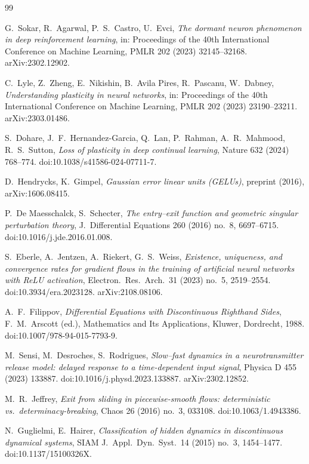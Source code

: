 \documentclass[11pt]{article}
\theoremstyle{definition}
\theoremstyle{remark}
\begin{document}
\begin{thebibliography}{99}

 G.~Sokar, R.~Agarwal, P.~S.~Castro, U.~Evci, \emph{The dormant
neuron phenomenon in deep reinforcement learning}, in: Proceedings of the 40th
International Conference on Machine Learning, PMLR 202 (2023) 32145--32168.
arXiv:2302.12902.

 C.~Lyle, Z.~Zheng, E.~Nikishin, B.~Avila Pires, R.~Pascanu,
W.~Dabney, \emph{Understanding plasticity in neural networks}, in: Proceedings of
the 40th International Conference on Machine Learning, PMLR 202 (2023)
23190--23211. arXiv:2303.01486.

 S.~Dohare, J.~F.~Hernandez-Garcia, Q.~Lan, P.~Rahman,
A.~R.~Mahmood, R.~S.~Sutton, \emph{Loss of plasticity in deep continual
learning}, Nature 632 (2024) 768--774. doi:10.1038/s41586-024-07711-7.

 D.~Hendrycks, K.~Gimpel, \emph{Gaussian error linear units
(GELUs)}, preprint (2016), arXiv:1606.08415.

 P.~De Maesschalck, S.~Schecter, \emph{The entry--exit function
and geometric singular perturbation theory}, J.~Differential Equations 260 (2016)
no.~8, 6697--6715. doi:10.1016/j.jde.2016.01.008.

 S.~Eberle, A.~Jentzen, A.~Riekert, G.~S.~Weiss, \emph{Existence,
uniqueness, and convergence rates for gradient flows in the training of
artificial neural networks with ReLU activation}, Electron.\ Res.\ Arch.\ 31
(2023) no.~5, 2519--2554. doi:10.3934/era.2023128. arXiv:2108.08106.

 A.~F.~Filippov, \emph{Differential Equations with Discontinuous
Righthand Sides}, F.~M.~Arscott (ed.), Mathematics and Its Applications, Kluwer,
Dordrecht, 1988. doi:10.1007/978-94-015-7793-9.

 M.~Sensi, M.~Desroches, S.~Rodrigues, \emph{Slow--fast dynamics
in a neurotransmitter release model: delayed response to a time-dependent input
signal}, Physica D 455 (2023) 133887. doi:10.1016/j.physd.2023.133887.
arXiv:2302.12852.

 M.~R.~Jeffrey, \emph{Exit from sliding in piecewise-smooth flows:
deterministic vs.\ determinacy-breaking}, Chaos 26 (2016) no.~3, 033108.
doi:10.1063/1.4943386.

 N.~Guglielmi, E.~Hairer, \emph{Classification of hidden dynamics
in discontinuous dynamical systems}, SIAM J.~Appl.\ Dyn.\ Syst.\ 14 (2015)
no.~3, 1454--1477. doi:10.1137/15100326X.


\end{thebibliography}
\end{document}
